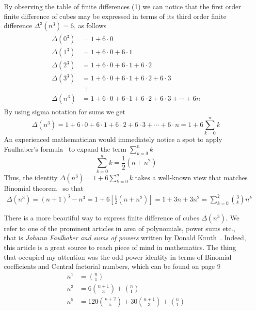 By observing the table of finite differences (1) we can notice that
the first order finite difference of cubes may be expressed in terms of its
third order finite difference $\Delta^3(n^3) = 6$, as follows
\begin{align}
    \label{eq:cubes_interpolation}
    \begin{split}
        \Delta(0^3) &= 1+6 \cdot 0 \\
        \Delta(1^3) &= 1+6\cdot0+6\cdot1 \\
        \Delta(2^3) &= 1+6\cdot0+6\cdot1+6\cdot2 \\
        \Delta(3^3) &= 1+6\cdot0+6\cdot1+6\cdot2+6\cdot3 \\
        &\; \; \vdots \\
        \Delta(n^3) &= 1+6\cdot0+6\cdot1+6\cdot2+6\cdot3 + \cdots + 6n
    \end{split}
\end{align}
By using sigma notation for sums we get
\begin{equation}
    \Delta(n^3) = 1+6\cdot0+6\cdot1+6\cdot2+6\cdot3+\cdots+6\cdot n = 1 + 6 \sum_{k=0}^{n} k
    \label{eq:general-cube-eq}
\end{equation}
An experienced mathematician would immediately notice a spot to apply Faulhaber's formula~\cite{beardon1996sums}
to expand the term $\sum_{k=0}^{n} k$
\begin{equation*}
    \sum_{k=0}^{n} k = \frac{1}{2}(n+n^2)
\end{equation*}
Thus, the identity $\Delta(n^3) = 1 + 6 \sum_{k=0}^{n} k$ takes a well-known view
that matches Binomial theorem~\cite{abramowitz1988handbook}
so that
\begin{align}
    \Delta(n^3) = (n+1)^3 - n^3 = 1 + 6 \left[ \frac{1}{2}(n+n^2) \right] = 1 + 3 n + 3 n^2 = \sum_{k=0}^{2} \binom{3}{k} n^k
    \label{eq:cubes-difference-binomial-theorem}
\end{align}

There is a more beautiful way to express finite difference of cubes $\Delta(n^3)$.
We refer to one of the prominent articles in area of polynomials, power sums etc.,
that is \textit{Johann Faulhaber and sums of powers} written by Donald Knuth~\cite{knuth1993johann}.
Indeed, this article is a great source to reach piece of mind in mathematics.
The thing that occupied my attention was the odd power identity in terms of Binomial coefficients and
Central factorial numbers, which can be found on page 9
\begin{align*}
    n^1 &= \binom{n}{1} \\
    n^3 &= 6 \binom{n+1}{3} + \binom{n}{1} \\
    n^5 &= 120 \binom{n+2}{5} + 30 \binom{n+1}{3} + \binom{n}{1}
\end{align*}

